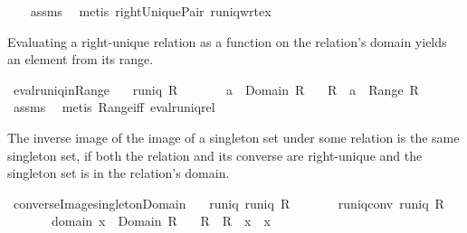 \begin{isabellebody}
%
\isadelimproof
\ \ %
\endisadelimproof
%
\isatagproof
{}\isamarkupfalse%
\ assms\ \isamarkupfalse%
\ {\isacharparenleft}metis\ rightUniquePair\ runiq{\isacharunderscore}wrt{\isacharunderscore}ex{}{\isacharparenright}%
\endisatagproof
{\isafoldproof}%
%
\isadelimproof
%
\endisadelimproof
%
\begin{isamarkuptext}%
Evaluating a right-unique relation as a function on the relation's domain yields an
  element from its range.%
\end{isamarkuptext}%
\isamarkuptrue%
\isamarkupfalse%
\ eval{\isacharunderscore}runiq{\isacharunderscore}in{\isacharunderscore}Range{\isacharcolon}\isanewline
\ \ \ {\isachardoublequoteopen}runiq\ R{\isachardoublequoteclose}\isanewline
\ \ \ \ \ \ \ {\isachardoublequoteopen}a\ {\isasymin}\ Domain\ R{\isachardoublequoteclose}\isanewline
\ \ \ {\isachardoublequoteopen}R\ {\isacharcomma}{\isacharcomma}\ a\ {\isasymin}\ Range\ R{\isachardoublequoteclose}\isanewline
%
\isadelimproof
\ \ %
\endisadelimproof
%
\isatagproof
{}\isamarkupfalse%
\ assms\ \isamarkupfalse%
\ {\isacharparenleft}metis\ Range{\isacharunderscore}iff\ eval{\isacharunderscore}runiq{\isacharunderscore}rel{\isacharparenright}%
\endisatagproof
{\isafoldproof}%
%
\isadelimproof
%
\endisadelimproof
%
\isamarkuptrue%
%
\begin{isamarkuptext}%
The inverse image of the image of a singleton set under some relation is the same
  singleton set, if both the relation and its converse are right-unique and the singleton set
  is in the relation's domain.%
\end{isamarkuptext}%
\isamarkuptrue%
\isamarkupfalse%
\ converse{\isacharunderscore}Image{\isacharunderscore}singleton{\isacharunderscore}Domain{\isacharcolon}\isanewline
\ \ \ runiq{\isacharcolon}\ {\isachardoublequoteopen}runiq\ R{\isachardoublequoteclose}\isanewline
\ \ \ \ \ \ \ runiq{\isacharunderscore}conv{\isacharcolon}\ {\isachardoublequoteopen}runiq\ {\isacharparenleft}R{\isasyminverse}{\isacharparenright}{\isachardoublequoteclose}\isanewline
\ \ \ \ \ \ \ domain{\isacharcolon}\ {\isachardoublequoteopen}x\ {\isasymin}\ Domain\ R{\isachardoublequoteclose}\isanewline
\ \ \ {\isachardoublequoteopen}R{\isasyminverse}\ {\isacharbackquote}{\isacharbackquote}\ R\ {\isacharbackquote}{\isacharbackquote}\ {\isacharbraceleft}x{\isacharbraceright}\ {\isacharequal}\ {\isacharbraceleft}x{\isacharbraceright}{\isachardoublequoteclose}\isanewline

\end{isabellebody}
